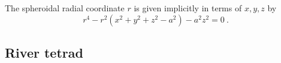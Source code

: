 \documentclass[twocolumn,showpacs,preprintnumbers,amsmath,amssymb,prb]{revtex4}
\begin{document}
The spheroidal radial coordinate $r$ is given implicitly
in terms of $x,y,z$ by
\begin{equation}
  r^4 - r^2 (x^2 + y^2 + z^2 - a^2) - a^2 z^2 = 0
  \ .
\end{equation}

\subsection{River tetrad}
\end{document}
